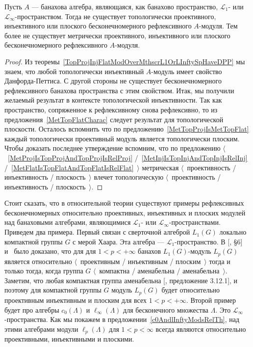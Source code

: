 \begin{corollary}\label{NoInfDimRefMetTopProjInjFlatModOverMthscrL1OrLInfty}
Пусть $A$ --- банахова алгебра, являющаяся, как банахово пространство,
$\mathscr{L}_1$- или $\mathscr{L}_\infty$-пространством. Тогда не существует
топологически проективного, инъективного или плоского бесконечномерного
рефлексивного $A$-модуля. Тем более не существует метрически проективного,
инъективного или плоского бесконечномерного рефлексивного $A$-модуля.
\end{corollary}
\begin{proof} Из теоремы~\ref{TopProjInjFlatModOverMthscrL1OrLInftySpHaveDPP} мы
знаем, что любой топологически инъективный $A$-модуль имеет свойство
Данфорда-Петтиса. С другой стороны не существует бесконечномерного рефлексивного
банахова пространства с этим свойством. Итак, мы получили желаемый результат в
контексте топологической инъективности. Так как пространство, сопряженное к
рефлексивному снова рефлексивно, то из предложения~\ref{MetTopFlatCharac}
следует результат для топологической плоскости. Осталось вспомнить что по
предложению~\ref{MetTopProjIsMetTopFlat} каждый топологически проективный модуль
является топологически плоским. Чтобы доказать последнее утверждение вспомним,
что по предложению $\langle$~\ref{MetProjIsTopProjAndTopProjIsRelProj}
/~\ref{MetInjIsTopInjAndTopInjIsRelInj}
/~\ref{MetFlatIsTopFlatAndTopFlatIsRelFlat}~$\rangle$ метрическая
$\langle$~проективность / инъективность / плоскость~$\rangle$ влечет
топологическую $\langle$~проективность / инъективность / плоскость~$\rangle$.
\end{proof}

Стоит сказать, что в относительной теории существуют примеры рефлексивных
бесконечномерных относительно проективных, инъективных и плоских модулей над
банаховыми алгебрами, являющимися $\mathscr{L}_1$- или
$\mathscr{L}_\infty$-пространствами. Приведем два примера. Первый связан с
сверточной алгеброй $L_1(G)$ локально компактной группы $G$ с мерой Хаара. Эта
алгебра --- $\mathscr{L}_1$-пространство. В [\cite{DalPolHomolPropGrAlg}, \S6]
и~\cite{RachInjModAndAmenGr} было доказано, что для для $1<p<+\infty$ банахов
$L_1(G)$-модуль $L_p(G)$ является относительно $\langle$~проективным /
инъективным / плоским~$\rangle$ тогда и только тогда, когда группа $G$
$\langle$~компактна / аменабельна / аменабельна~$\rangle$. Заметим, что любая
компактная группа аменабельна [\cite{PierAmenLCA}, предложение 3.12.1], и
поэтому для компактной группы $G$ модуль $L_p(G)$ будет относительно проективным
инъективным и плоским для всех $1<p<+\infty$. Второй пример будет про алгебры
$c_0(\Lambda)$ и $\ell_\infty(\Lambda)$ для бесконечного множества $\Lambda$.
Это $\mathscr{L}_\infty$-пространства. Как мы покажем в
предложении~\ref{c0AndlInftyModsRelTh}, над этими алгебрами модули
$\ell_p(\Lambda)$ для $1<p<\infty$ всегда являются относительно проективными,
инъективными и плоскими. 

